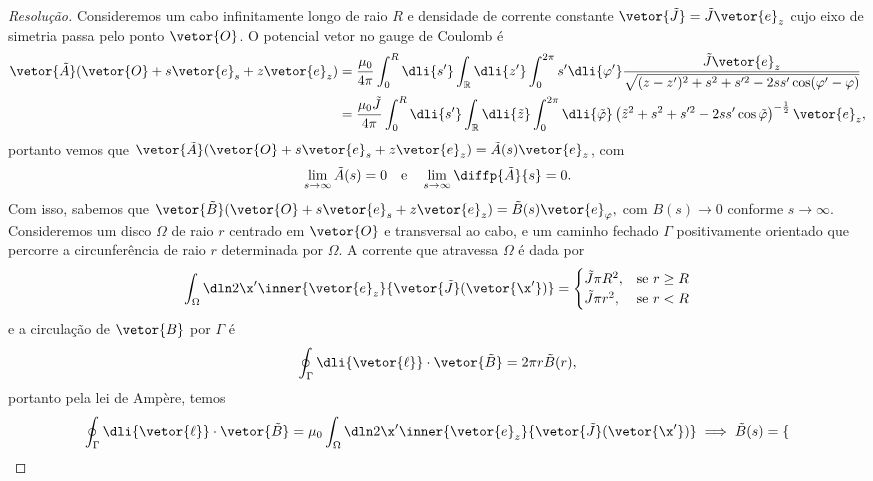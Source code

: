 \begin{proof}[Resolução]
    Consideremos um cabo infinitamente longo de raio \(R\) e densidade de corrente constante \(\vetor{\tilde{J}} = \tilde{J}\vetor{e}_z\) cujo eixo de simetria passa pelo ponto \(\vetor{O}\). O potencial vetor no gauge de Coulomb é
    \begin{align*}
        \vetor{\tilde{A}}(\vetor{O} + s \vetor{e}_s + z \vetor{e}_z)
        &= \frac{\mu_0}{4\pi} \int_0^R \dli{s'} \int_{\mathbb{R}}\dli{z'} \int_0^{2\pi}s' \dli{\varphi'} \frac{\tilde{J}\vetor{e}_z}{\sqrt{(z - z')^2 + s^2 + s'^2 - 2ss'\cos(\varphi' - \varphi)}}\\
        &= \frac{\mu_0\tilde{J}}{4\pi} \int_0^R \dli{s'} \int_{\mathbb{R}}\dli{\tilde{z}} \int_0^{2\pi} \dli{\tilde{\varphi}} \left(\tilde{z}^2 + s^2 + s'^2 - 2ss'\cos\tilde\varphi\right)^{-\frac12}\vetor{e}_z,
    \end{align*}
    portanto vemos que \(\vetor{\tilde{A}}(\vetor{O} + s\vetor{e}_s + z\vetor{e}_z) = \tilde{A}(s)\vetor{e}_z\), com
    \begin{equation*}
        \lim_{s \to \infty} \tilde{A}(s) = 0
        \quad\text{e}\quad
        \lim_{s \to \infty} \diffp{\tilde{A}}{s} = 0.
    \end{equation*}
    Com isso, sabemos que \(\vetor{\tilde{B}}(\vetor{O} + s\vetor{e}_s + z\vetor{e}_z) = \tilde{B}(s)\vetor{e}_{\varphi},\) com \(B(s) \to 0\) conforme \(s \to \infty\). Consideremos um disco \(\Omega\) de raio \(r\) centrado em \(\vetor{O}\) e transversal ao cabo, e um caminho fechado \(\Gamma\) positivamente orientado que percorre a circunferência de raio \(r\) determinada por \(\Omega\). A corrente que atravessa \(\Omega\) é dada por
    \begin{equation*}
        \int_{\Omega}\dln2{\x'} \inner{\vetor{e}_z}{\vetor{\tilde{J}}(\vetor{\x'})} = \begin{cases}
            \tilde{J}\pi R^2,&\text{se }r \geq R\\
            \tilde{J}\pi r^2,&\text{se }r < R
        \end{cases}
    \end{equation*}
    e a circulação de \(\vetor{B}\) por \(\Gamma\) é
    \begin{equation*}
        \oint_{\Gamma} \dli{\vetor{\ell}}\cdot \vetor{\tilde{B}} = 2\pi r \tilde{B}(r),
    \end{equation*}
    portanto pela lei de Ampère, temos
    \begin{equation*}
        \oint_{\Gamma} \dli{\vetor{\ell}}\cdot \vetor{\tilde{B}} = \mu_0\int_{\Omega}\dln2{\x'} \inner{\vetor{e}_z}{\vetor{\tilde{J}}(\vetor{\x'})}  \implies \tilde{B}(s) = \begin{cases}

\end{cases}
\end{equation*}
\end{proof}
